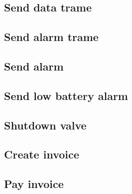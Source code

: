 \newpage
\subsection{Send data trame}
\label{uc:send-data-trame}


\newpage
\subsection{Send alarm trame}
\label{uc:send-alarm-trame}


\newpage
\subsection{Send alarm}
\label{uc:send-alarm}


\newpage
\subsection{Send low battery alarm}
\label{uc:send-low-battery-alarm}


\newpage
\subsection{Shutdown valve}
\label{uc:shutdown-valve}


\newpage
\subsection{Create invoice}
\label{uc:create-invoice}


\newpage
\subsection{Pay invoice}
\label{uc:pay-invoice}
